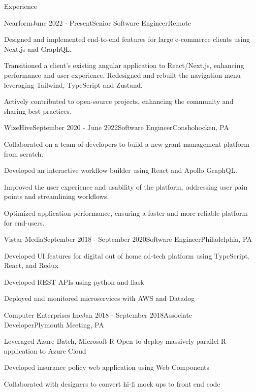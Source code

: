 \documentclass{resume} %
\begin{document}
\begin{rSection}{Experience}

\begin{rSubsection}{Nearform}{June 2022 - Present}{Senior Software Engineer}{Remote}
\item Designed and implemented end-to-end features for large e-commerce clients using Next.js and GraphQL.
\item Transitioned a client’s existing angular application to React/Next.js, enhancing performance and user experience. Redesigned and rebuilt the navigation menu leveraging Tailwind, TypeScript and Zustand.
\item Actively contributed to open-source projects, enhancing the community and sharing best practices.
\end{rSubsection}

\begin{rSubsection}{WizeHive}{September 2020 - June 2022}{Software Engineer}{Conshohocken, PA}
\item Collaborated on a team of developers to build a new grant management platform from scratch.
\item Developed an interactive workflow builder using React and Apollo GraphQL.
\item Improved the user experience and usability of the platform, addressing user pain points and streamlining workflows.
\item Optimized application performance, ensuring a faster and more reliable platform for end-users.
\end{rSubsection}

\begin{rSubsection}{Vistar Media}{September 2018 - September 2020}{Software Engineer}{Philadelphia, PA}
\item Developed UI features for digital out of home ad-tech platform using TypeScript, React, and Redux
\item Developed REST APIs using python and flask
\item Deployed and monitored microservices with AWS and Datadog
\end{rSubsection}

\begin{rSubsection}{Computer Enterprises Inc}{Jan 2018 - September 2018}{Associate Developer}{Plymouth Meeting, PA}
\item Leveraged Azure Batch, Microsoft R Open to deploy massively parallel R application to Azure Cloud
\item Developed insurance policy web application using Web Components
\item Collaborated with designers to convert hi-fi mock ups to front end code
\end{rSubsection}


\end{rSection}
\end{document}
